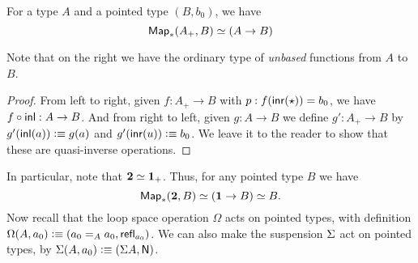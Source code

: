 \begin{lem}
  For a type $A$ and a pointed type $(B,b_0)$, we have
  \[ \eqv{\Map_*(A_+,B)}{(A\to B)} \]
\end{lem}
Note that on the right we have the ordinary type of \emph{unbased} functions from $A$ to $B$.
\begin{proof}
  From left to right, given $f:A_+ \to B$ with $p:f(\inr(\ttt)) = b_0$, we have $f\circ \inl : A \to B$.
  And from right to left, given $g:A\to B$ we define $g':A_+ \to B$ by $g'(\inl(a))\defeq g(a)$ and $g'(\inr(u)) \defeq b_0$.
  We leave it to the reader to show that these are quasi-inverse operations.
\end{proof}

In particular, note that $\eqv{\bool}{\unit_+}$.
Thus, for any pointed type $B$ we have
\[{\Map_*(\bool,B)} \eqvsym {(\unit \to B)}\eqvsym B.\]
%
Now recall that the loop space operation $\Omega$ acts on pointed types, with definition $\Omega(A,a_0) \defeq (\id[A]{a_0}{a_0},\refl{a_0})$.
We can also make the suspension $\susp$ act on pointed types, by $\susp(A,a_0)\defeq (\susp A,\north)$.

